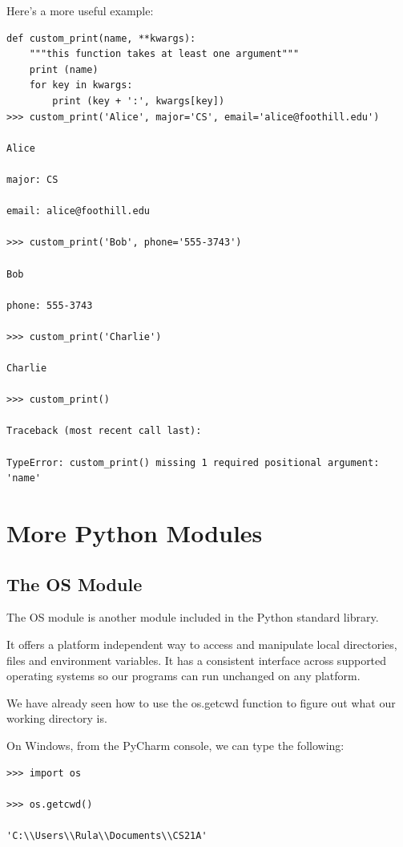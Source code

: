 \documentclass{article}
\begin{document}
Here's a more useful example:

\begin{lstlisting}
def custom_print(name, **kwargs):
    """this function takes at least one argument"""
    print (name)
    for key in kwargs:
        print (key + ':', kwargs[key])
>>> custom_print('Alice', major='CS', email='alice@foothill.edu')

Alice

major: CS

email: alice@foothill.edu

>>> custom_print('Bob', phone='555-3743')

Bob

phone: 555-3743

>>> custom_print('Charlie')

Charlie

>>> custom_print()

Traceback (most recent call last):

TypeError: custom_print() missing 1 required positional argument: 'name'
\end{lstlisting}

\section{More Python Modules}
\subsection{The OS Module}
The OS module is another module included in the Python standard library.

It offers a platform independent way to access and manipulate local directories, files and environment variables.   It has a consistent interface across supported operating systems so our programs can run unchanged on any platform.

We have already seen how to use the  os.getcwd function to figure out what our working directory is.

On Windows, from the PyCharm console, we can type the following:

\begin{lstlisting}
>>> import os

>>> os.getcwd()

'C:\\Users\\Rula\\Documents\\CS21A'
\end{lstlisting}
\end{document}
